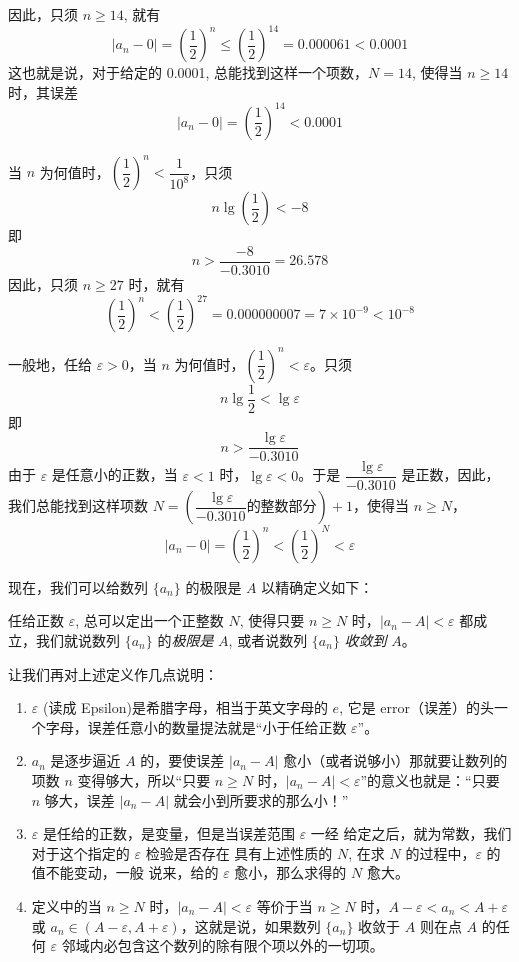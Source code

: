 因此，只须 $n\geqslant 14$, 就有
\[|a_n-0|=\left(\frac{1}{2}\right)^n\leqslant \left(\frac{1}{2}\right)^{14}=0.000061<0.0001\]
这也就是说，对于给定的 0.0001, 总能找到这样一个项数，$N=14$, 使得当  $n\geqslant14$ 时，其误差
\[|a_n-0|=\left(\frac{1}{2}\right)^{14}<0.0001\]

当 $n$ 为何值时，$\left(\dfrac{1}{2}\right)^n<\dfrac{1}{10^8}$，只须
\[n\lg\left(\frac{1}{2}\right)<-8\]
即
\[n>\frac{-8}{-0.3010}=26.578\]
因此，只须 $n\geqslant 27$ 时，就有
\[\left(\frac{1}{2}\right)^n<\left(\frac{1}{2}\right)^{27}=0.000000007=7\times 10^{-9}<10^{-8}\]

一般地，任给 $\varepsilon >0$，当 $n$ 为何值时，$\left(\dfrac{1}{2}\right)^n<\varepsilon$。只须
\[n\lg \frac{1}{2}<\lg\varepsilon\] 
即
\[n>\frac{\lg\varepsilon}{-0.3010}\]
由于 $\varepsilon$ 是任意小的正数，当 $\varepsilon <1$ 时，$\lg\varepsilon <0$。于是 $\dfrac{\lg\varepsilon}{-0.3010}$ 是正数，因此，我们总能找到这样项数 $N=\left(\dfrac{\lg\varepsilon}{-0.3010}\text{的整数部分}\right)+1$，使得当 $n\geqslant N$，
\[|a_n-0|=\left(\frac{1}{2}\right)^n<\left(\frac{1}{2}\right)^N<\varepsilon  \]

现在，我们可以给数列 $\{a_n\}$ 的极限是 $A$ 以精确定义如下：

\begin{Definition}
  任给正数 $\varepsilon$, 总可以定出一个正整数 $N$, 使得只要 $n\geqslant N$ 时，$|a_n-A|<\varepsilon$ 都成立，我们就说数列 $\{a_n\}$ 的\emph{极限是} $A$, 或者说数列 $\{a_n\}$ \emph{收敛到} $A$。
\end{Definition}
 
让我们再对上述定义作几点说明：
\begin{enumerate}
  \item $\varepsilon$ (读成 Epsilon)是希腊字母，相当于英文字母的 $e$, 它是 error（误差）的头一个字母，误差任意小的数量提法就是“小于任给正数 $\varepsilon$”。
  \item $a_n$ 是逐步逼近 $A$ 的，要使误差 $|a_n-A|$ 愈小（或者说够小）那就要让数列的项数 $n$ 变得够大，所以“只要 $n\geqslant N$ 时，$|a_n-A|<\varepsilon$”的意义也就是：“只要 $n$ 够大，误差 $|a_n-A|$ 就会小到所要求的那么小！”
  \item $\varepsilon$ 是任给的正数，是变量，但是当误差范围 $\varepsilon$ 一经
给定之后，就为常数，我们对于这个指定的 $\varepsilon$ 检验是否存在
具有上述性质的 $N$, 在求 $N$ 的过程中，$\varepsilon$ 的值不能变动，一般
说来，给的 $\varepsilon$ 愈小，那么求得的 $N$ 愈大。
  \item 定义中的当 $n\geqslant N$ 时，$|a_n-A|<\varepsilon$ 等价于当 $n\geqslant N$ 时，$A-\varepsilon<a_n<A+\varepsilon$ 或 $a_n\in (A-\varepsilon,A+\varepsilon)$，这就是说，如果数列 $\{a_n\}$ 收敛于 $A$ 则在点 $A$ 的任何 $\varepsilon$ 邻域内必包含这个数列的除有限个项以外的一切项。
\end{enumerate}

